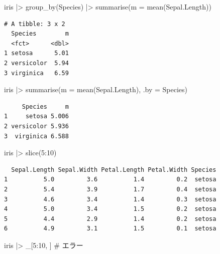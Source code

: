 \documentclass[
  letterpaper,
  DIV=11,
  numbers=noendperiod]{scrreprt}
\newenvironment{Shaded}{\begin{snugshade}}{\end{snugshade}}
\newcommand{\AttributeTok}[1]{\textcolor[rgb]{0.40,0.45,0.13}{#1}}
\newcommand{\CommentTok}[1]{\textcolor[rgb]{0.37,0.37,0.37}{#1}}
\newcommand{\DecValTok}[1]{\textcolor[rgb]{0.68,0.00,0.00}{#1}}
\newcommand{\FunctionTok}[1]{\textcolor[rgb]{0.28,0.35,0.67}{#1}}
\newcommand{\NormalTok}[1]{\textcolor[rgb]{0.00,0.23,0.31}{#1}}
\newcommand{\SpecialCharTok}[1]{\textcolor[rgb]{0.37,0.37,0.37}{#1}}
\begin{document}
\begin{Shaded}
\begin{Highlighting}[]
\NormalTok{iris }\SpecialCharTok{|\textgreater{}} \FunctionTok{group\_by}\NormalTok{(Species) }\SpecialCharTok{|\textgreater{}} \FunctionTok{summarise}\NormalTok{(}\AttributeTok{m =} \FunctionTok{mean}\NormalTok{(Sepal.Length))}
\end{Highlighting}
\end{Shaded}

\begin{verbatim}
# A tibble: 3 x 2
  Species        m
  <fct>      <dbl>
1 setosa      5.01
2 versicolor  5.94
3 virginica   6.59
\end{verbatim}

\begin{Shaded}
\begin{Highlighting}[]
\NormalTok{iris }\SpecialCharTok{|\textgreater{}} \FunctionTok{summarise}\NormalTok{(}\AttributeTok{m =} \FunctionTok{mean}\NormalTok{(Sepal.Length), }\AttributeTok{.by =}\NormalTok{ Species)}
\end{Highlighting}
\end{Shaded}

\begin{verbatim}
     Species     m
1     setosa 5.006
2 versicolor 5.936
3  virginica 6.588
\end{verbatim}

\begin{Shaded}
\begin{Highlighting}[]
\NormalTok{iris }\SpecialCharTok{|\textgreater{}} \FunctionTok{slice}\NormalTok{(}\DecValTok{5}\SpecialCharTok{:}\DecValTok{10}\NormalTok{)}
\end{Highlighting}
\end{Shaded}

\begin{verbatim}
  Sepal.Length Sepal.Width Petal.Length Petal.Width Species
1          5.0         3.6          1.4         0.2  setosa
2          5.4         3.9          1.7         0.4  setosa
3          4.6         3.4          1.4         0.3  setosa
4          5.0         3.4          1.5         0.2  setosa
5          4.4         2.9          1.4         0.2  setosa
6          4.9         3.1          1.5         0.1  setosa
\end{verbatim}

\begin{Shaded}
\begin{Highlighting}[]
\NormalTok{iris }\SpecialCharTok{|\textgreater{}}\NormalTok{ \_[}\DecValTok{5}\SpecialCharTok{:}\DecValTok{10}\NormalTok{, ] }\CommentTok{\# エラー}
\end{Highlighting}
\end{Shaded}
\end{document}
